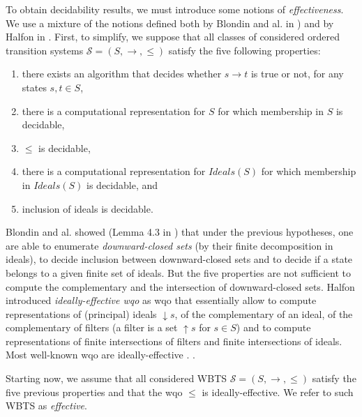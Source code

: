 \documentclass[runningheads]{llncs}
\begin{document}
To obtain decidability results, we must introduce some notions of \emph{effectiveness}. We use a mixture of the notions defined both by Blondin and al. in \cite{DBLP:journals/lmcs/BlondinFM17}) and by Halfon in \cite{DBLP:phd/hal/Halfon18}.
First, to simplify, we suppose that all classes of considered ordered transition systems $\mathscr{S}=(S, \rightarrow, \leq)$ satisfy the five following properties:
\begin{enumerate}
\item there exists an algorithm that decides whether $s \rightarrow t$ is true or not, for any states $s,t \in S$,
%
\item there is a computational representation for $S$ for which membership in $S$ is decidable,
%
\item $\leq$ is decidable,
\item there is a computational representation for $Ideals(S)$ for which membership in $Ideals(S)$ is decidable, and
\item  inclusion of ideals is decidable. 
\end{enumerate}
%
Blondin and al. showed (Lemma 4.3 in \cite{DBLP:journals/lmcs/BlondinFM17}) that under the previous hypotheses, one are able to enumerate \emph{downward-closed sets} (by their finite decomposition in ideals), to decide inclusion between downward-closed sets and to decide if a state belongs to a given finite set of ideals. But the five properties are not sufficient to compute the complementary and the intersection of downward-closed sets.
%
Halfon introduced \emph{ideally-effective wqo} as wqo that essentially allow to compute representations of (principal) ideals $\mathop{\downarrow} s$, of the complementary of an ideal, of the complementary of filters (a filter is a set $\mathop{\uparrow} s$ for $s \in S$) and to compute representations of finite intersections of filters and finite intersections of ideals. Most well-known wqo are ideally-effective . \cite{DBLP:phd/hal/Halfon18}.

%
Starting now, we assume that all considered WBTS $\mathscr{S}=(S, \rightarrow, \leq)$ satisfy the five previous properties and that the wqo $\leq$ is ideally-effective. We refer to such WBTS as \emph{effective}.
\end{document}
